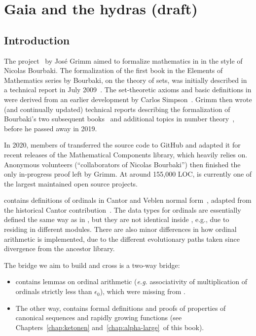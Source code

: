 \chapter{Gaia and the hydras (draft)}
\label{gaia-chapter}

\section{Introduction}
The \gaia project~\cite{Gaia} by Jos\'e Grimm aimed to formalize mathematics in \coq  in
the style of Nicolas Bourbaki. The formalization of the first book in the
Elements of Mathematics series by Bourbaki, on the theory of sets, was
initially described in a technical report in July 2009~\cite{Grimm2009a}.
The set-theoretic axioms and basic definitions in \gaia were derived
from an earlier development by Carlos Simpson~\cite{Simpson2004,CatsZFCContrib}.
Grimm then wrote (and continually updated) technical reports describing the
formalization of Bourbaki's two subsequent books~\cite{Grimm2009b,Grimm2016}
and additional topics in number theory~\cite{grimm:hal-00911710,Grimm2014},
before he passed away in 2019.

In 2020, members of \community transferred the \gaia source code to
GitHub and adapted it for recent releases of the Mathematical Components
library, which \gaia heavily relies on.
Anonymous volunteers (``collaborators of Nicolas Bourbaki'') then finished
the only in-progress proof left by Grimm. At around 155,000 LOC, \gaia is currently one of the largest maintained open source \coq projects.

\gaia contains definitions of ordinals in Cantor and Veblen normal form~\cite{grimm:hal-00911710}, adapted from the historical Cantor contribution~\cite{CantorContrib}. The data types for ordinals are essentially defined the same way as in \Hydras, but they are not identical inside \coq, e.g., due to residing in different modules. There are also minor differences in how ordinal arithmetic is implemented, due to the different evolutionary paths taken since divergence from the ancestor library.



The bridge we aim to build and cross is a two-way bridge:

\begin{itemize}
\item \gaia contains lemmas on ordinal arithmetic (\emph{e.g.} associativity of multiplication of ordinals strictly less than $\epsilon_0$), which were missing from \Hydras. 
  \item The other way, \Hydras contains formal definitions and proofs of properties of canonical sequences and rapidly growing functions  (see Chapters~\ref{chap:ketonen} and~\ref{chap:alpha-large}~of this book).
  \end{itemize}
  
